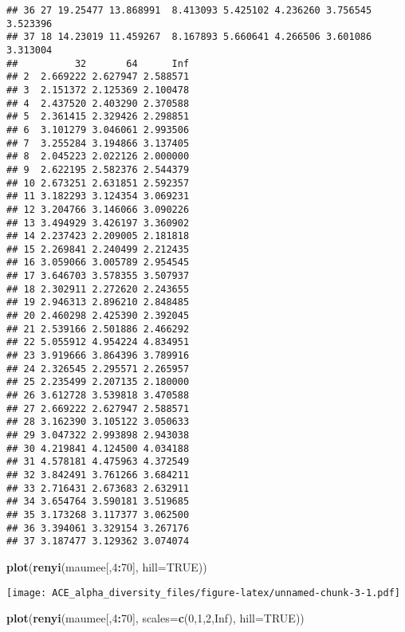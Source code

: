 \documentclass[]{article}
\newenvironment{Shaded}{\begin{snugshade}}{\end{snugshade}}
\newcommand{\KeywordTok}[1]{\textcolor[rgb]{0.13,0.29,0.53}{\textbf{#1}}}
\newcommand{\DataTypeTok}[1]{\textcolor[rgb]{0.13,0.29,0.53}{#1}}
\newcommand{\DecValTok}[1]{\textcolor[rgb]{0.00,0.00,0.81}{#1}}
\newcommand{\OtherTok}[1]{\textcolor[rgb]{0.56,0.35,0.01}{#1}}
\newcommand{\OperatorTok}[1]{\textcolor[rgb]{0.81,0.36,0.00}{\textbf{#1}}}
\newcommand{\NormalTok}[1]{#1}
\begin{document}
\begin{verbatim}
## 36 27 19.25477 13.868991  8.413093 5.425102 4.236260 3.756545 3.523396
## 37 18 14.23019 11.459267  8.167893 5.660641 4.266506 3.601086 3.313004
##          32       64      Inf
## 2  2.669222 2.627947 2.588571
## 3  2.151372 2.125369 2.100478
## 4  2.437520 2.403290 2.370588
## 5  2.361415 2.329426 2.298851
## 6  3.101279 3.046061 2.993506
## 7  3.255284 3.194866 3.137405
## 8  2.045223 2.022126 2.000000
## 9  2.622195 2.582376 2.544379
## 10 2.673251 2.631851 2.592357
## 11 3.182293 3.124354 3.069231
## 12 3.204766 3.146066 3.090226
## 13 3.494929 3.426197 3.360902
## 14 2.237423 2.209005 2.181818
## 15 2.269841 2.240499 2.212435
## 16 3.059066 3.005789 2.954545
## 17 3.646703 3.578355 3.507937
## 18 2.302911 2.272620 2.243655
## 19 2.946313 2.896210 2.848485
## 20 2.460298 2.425390 2.392045
## 21 2.539166 2.501886 2.466292
## 22 5.055912 4.954224 4.834951
## 23 3.919666 3.864396 3.789916
## 24 2.326545 2.295571 2.265957
## 25 2.235499 2.207135 2.180000
## 26 3.612728 3.539818 3.470588
## 27 2.669222 2.627947 2.588571
## 28 3.162390 3.105122 3.050633
## 29 3.047322 2.993898 2.943038
## 30 4.219841 4.124500 4.034188
## 31 4.578181 4.475963 4.372549
## 32 3.842491 3.761266 3.684211
## 33 2.716431 2.673683 2.632911
## 34 3.654764 3.590181 3.519685
## 35 3.173268 3.117377 3.062500
## 36 3.394061 3.329154 3.267176
## 37 3.187477 3.129362 3.074074
\end{verbatim}

\begin{Shaded}
\begin{Highlighting}[]
\KeywordTok{plot}\NormalTok{(}\KeywordTok{renyi}\NormalTok{(maumee[,}\DecValTok{4}\OperatorTok{:}\DecValTok{70}\NormalTok{], }\DataTypeTok{hill=}\OtherTok{TRUE}\NormalTok{))}
\end{Highlighting}
\end{Shaded}

\texttt{[image: ACE\_alpha\_diversity\_files/figure-latex/unnamed-chunk-3-1.pdf]}

\begin{Shaded}
\begin{Highlighting}[]
\KeywordTok{plot}\NormalTok{(}\KeywordTok{renyi}\NormalTok{(maumee[,}\DecValTok{4}\OperatorTok{:}\DecValTok{70}\NormalTok{], }\DataTypeTok{scales=}\KeywordTok{c}\NormalTok{(}\DecValTok{0}\NormalTok{,}\DecValTok{1}\NormalTok{,}\DecValTok{2}\NormalTok{,}\OtherTok{Inf}\NormalTok{), }\DataTypeTok{hill=}\OtherTok{TRUE}\NormalTok{))}
\end{Highlighting}
\end{Shaded}
\end{document}

